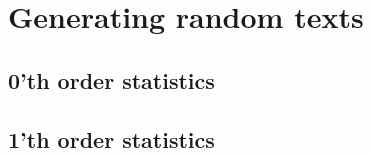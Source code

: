 \documentclass[fsharpnotes.tex]{subfiles}
\begin{document}
\section{Generating random texts}
\subsection{0'th order statistics}

\subsection{1'th order statistics}
\end{document}
